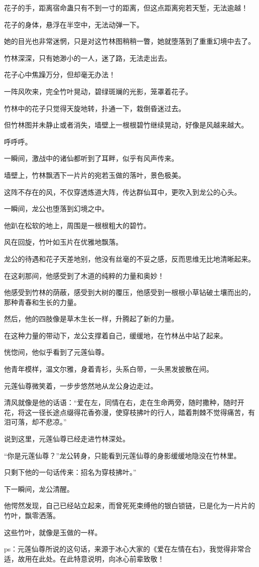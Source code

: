 \begin{this_body}
花子的手，距离宿命蛊只有不到一寸的距离，但这点距离宛若天堑，无法逾越！

花子的身体，悬浮在半空中，无法动弹一下。

她的目光也非常迷惘，只是对这竹林图稍稍一瞥，她就堕落到了重重幻境中去了。

竹林深深，只有她渺小的一人，迷了路，无法走出去。

花子心中焦躁万分，但却毫无办法！

一阵风吹来，完全竹叶晃动，碧绿斑斓的光影，笼罩着花子。

竹林中的花子只觉得天旋地转，扑通一下，栽倒昏迷过去。

但竹林图并未静止或者消失，墙壁上一根根碧竹继续晃动，好像是风越来越大。

呼呼呼。

一瞬间，激战中的诸仙都听到了耳畔，似乎有风声传来。

墙壁上，竹林飘洒下一片片的宛若玉做的落叶，景色极美。

这阵不存在的风，不仅穿透炼道大阵，传达群仙耳中，更吹入到龙公的心头。

一瞬间，龙公也堕落到幻境之中。

他趴在松软的地上，周围是一根根粗大的碧竹。

风在回旋，竹叶如玉片在优雅地飘落。

龙公的待遇和花子天差地别，他没有丝毫的不妥之感，反而思维无比地清晰起来。

在这刹那间，他感受到了木道的纯粹的力量和奥妙！

他感受到竹林的荫蔽，感受到大树的覆压，他感受到一根根小草钻破土壤而出的，那种青春和生长的力量。

然后，他的四肢像是草木生长一样，升腾起了新的力量。

在这种力量的带动下，龙公支撑着自己，缓缓地，在竹林丛中站了起来。

恍惚间，他似乎看到了元莲仙尊。

他青年模样，温文尔雅，身着青衫，头系白带，一头黑发披散在间。

元莲仙尊微笑着，一步步悠然地从龙公身边走过。

清风就像是他的话语：“爱在左，同情在右，走在生命两旁，随时撒种，随时开花，将这一径长途点缀得花香弥漫，使穿枝拂叶的行人，踏着荆棘不觉得痛苦，有泪可落，却不悲凉。”

说到这里，元莲仙尊已经走进竹林深处。

“你是元莲仙尊？”龙公转身，只能看到元莲仙尊的身影缓缓地隐没在竹林里。

只剩下他的一句话传来：招名为穿枝拂叶。”

下一瞬间，龙公清醒。

他愕然发现，自己已经站立起来，而曾死死束缚他的银白锁链，已是化为一片片的竹叶，飘零洒落。

这些竹叶，就像是玉做的一样。

ps：元莲仙尊所说的这句话，来源于冰心大家的《爱在左情在右》，我觉得非常合适，故用在此处。在此特意说明，向冰心前辈致敬！

\end{this_body}

